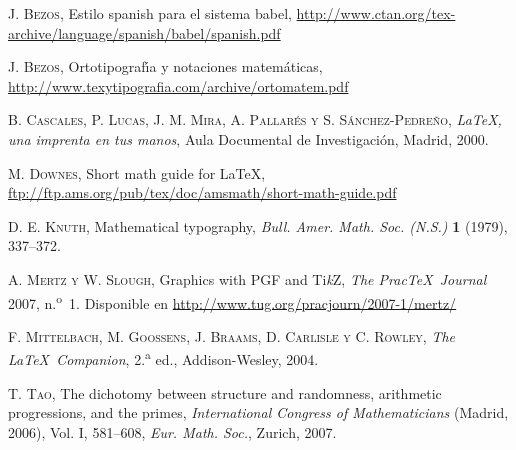 \documentclass[autocontact]{gaceta}
\begin{document}
\begin{thebibliography}{9}

\textsc{J. Bezos}, 
Estilo spanish para el sistema babel,
\url{http://www.ctan.org/tex-archive/language/spanish/babel/spanish.pdf}

\textsc{J. Bezos}, 
Ortotipograf\'{\i}a y notaciones matem\'aticas,
\url{http://www.texytipografia.com/archive/ortomatem.pdf}

\textsc{B. Cascales, P. Lucas, J. M. Mira, A. Pallar\'es y S. S\'anchez-Pedre\~no}, 
\textit{LaTeX, una imprenta en tus manos}, 
Aula Documental de Investigaci\'on, Madrid, 2000.

\textsc{M. Downes},
Short math guide for \LaTeX,
\url{ftp://ftp.ams.org/pub/tex/doc/amsmath/short-math-guide.pdf}

\textsc{D. E. Knuth}, 
Mathematical typography, 
\textit{Bull. Amer. Math. Soc. (N.S.)} 
\textbf{1} (1979), 337--372. 

\textsc{A. Mertz y W. Slough},
Graphics with PGF and Ti\textit{k}Z,
\textit{The Prac\TeX\ Journal} 2007, n.\textsuperscript{o}~1.
Disponible en
\url{http://www.tug.org/pracjourn/2007-1/mertz/}

\textsc{F. Mittelbach, M. Goossens, J. Braams, D. Carlisle y C. Rowley}, 
\textit{The \LaTeX\ Companion}, 
2.\textsuperscript{a} ed., 
Addison-Wesley, 2004. 

\textsc{T. Tao}, 
The dichotomy between structure and randomness, arithmetic progressions, and the primes, 
\textit{International Congress of Mathematicians} (Madrid, 2006), 
Vol. I, 581--608, \textit{Eur. Math. Soc.}, Zurich, 2007.

\end{thebibliography}

\end{document}

